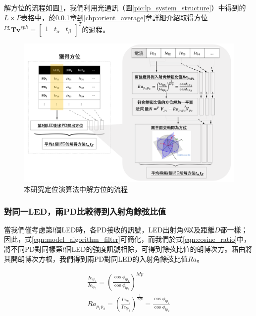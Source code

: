     解方位的流程如圖\ref{pic:orient_flow}，我們利用光通訊（圖\ref{pic:lp_system_structure}）中得到的$L\times P$表格中，於\ref{chp:cosine_ratio}章到\ref{chp:orient_average}章詳細介紹取得方位$^{PL}\boldsymbol{Tv}^{sph} = \left[\begin{array}{ccc}1&t_{\alpha}&t_{\beta}\end{array}\right]^T$的過程。

    \begin{figure}[h]
        \centering
        \includegraphics[width=14cm]{ch3pic/orient_flow.png}
        \caption{本研究定位演算法中解方位的流程}
        \label{pic:orient_flow}
    \end{figure}

    \subsubsection{對同一LED，兩PD比較得到入射角餘弦比值}
    \label{chp:cosine_ratio}
    
        當我們僅考慮第$l$個LED時，各PD接收的訊號，LED出射角$\theta$以及距離$D$都一樣；因此，式\ref{eqn:model_algorithm_filter}可簡化，而我們於式\ref{eqn:cosine_ratio}中，將不同PD對同樣第$l$個LED的強度訊號相除，可得到餘弦比值的朗博次方。藉由將其開朗博次方根，我們得到兩PD對同LED的入射角餘弦比值$Ra$。
    
        \begin{equation}
            \label{eqn:cosine_ratio}
            \begin{aligned}
                \frac{Ie_{lp_1}}{Ie_{lp_2}}={(\frac{\cos\phi_{lp_1}} {\cos\phi_{lp_2}})}^{Mp}\\
                Ra_{p_1p_2} = {( \frac{Ie_{lp_1}}{Ie_{lp_2}})} ^{\frac{1}{Mp}} = \frac{\cos\phi_{lp_1}}{\cos\phi_{lp_2}}
            \end{aligned}
        \end{equation}

